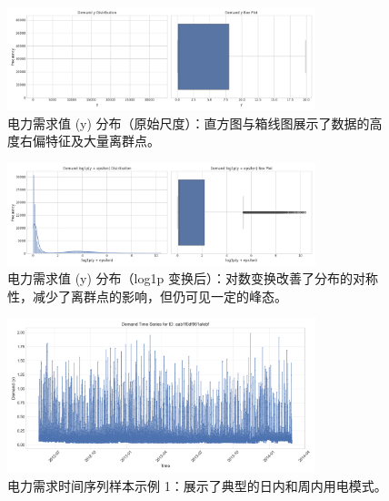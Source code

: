 \documentclass{article} %
\begin{document}
\begin{figure}[H] %
    \centering
    \includegraphics[width=0.8\textwidth]{../plots/demand_y_distribution_original_scale.png}
    \caption{电力需求值 (y) 分布（原始尺度）：直方图与箱线图展示了数据的高度右偏特征及大量离群点。} %
    \label{fig:demand_y_dist_orig}
\end{figure}

\begin{figure}[H]
    \centering
    \includegraphics[width=0.8\textwidth]{../plots/demand_y_distribution_log1p_scale.png}
    \caption{电力需求值 (y) 分布（log1p 变换后）：对数变换改善了分布的对称性，减少了离群点的影响，但仍可见一定的峰态。} %
    \label{fig:demand_y_dist_log}
\end{figure}

\begin{figure}[H]
    \centering
    \includegraphics[width=0.8\textwidth]{../plots/timeseries_sample_aab1f0df961afebf.png}
    \caption{电力需求时间序列样本示例 1：展示了典型的日内和周内用电模式。} %
    \label{fig:timeseries_sample_1}
\end{figure}
\end{document}
